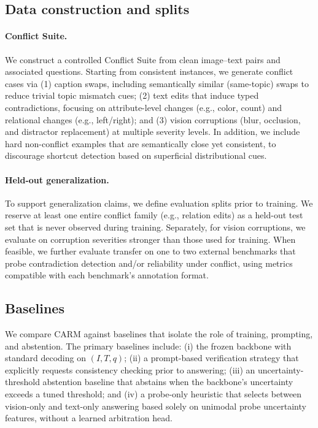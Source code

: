 \documentclass{article}
\begin{document}
\subsection{Data construction and splits}
\paragraph{Conflict Suite.}
We construct a controlled Conflict Suite from clean image--text pairs and associated questions. Starting from consistent instances, we generate conflict cases via (1) caption swaps, including semantically similar (same-topic) swaps to reduce trivial topic mismatch cues; (2) text edits that induce typed contradictions, focusing on attribute-level changes (e.g., color, count) and relational changes (e.g., left/right); and (3) vision corruptions (blur, occlusion, and distractor replacement) at multiple severity levels. In addition, we include hard non-conflict examples that are semantically close yet consistent, to discourage shortcut detection based on superficial distributional cues.

\paragraph{Held-out generalization.}
To support generalization claims, we define evaluation splits prior to training. We reserve at least one entire conflict family (e.g., relation edits) as a held-out test set that is never observed during training. Separately, for vision corruptions, we evaluate on corruption severities stronger than those used for training. When feasible, we further evaluate transfer on one to two external benchmarks that probe contradiction detection and/or reliability under conflict, using metrics compatible with each benchmark’s annotation format.

\subsection{Baselines}
We compare CARM against baselines that isolate the role of training, prompting, and abstention. The primary baselines include: (i) the frozen backbone with standard decoding on $(I,T,q)$; (ii) a prompt-based verification strategy that explicitly requests consistency checking prior to answering; (iii) an uncertainty-threshold abstention baseline that abstains when the backbone’s uncertainty exceeds a tuned threshold; and (iv) a probe-only heuristic that selects between vision-only and text-only answering based solely on unimodal probe uncertainty features, without a learned arbitration head.
\end{document}
